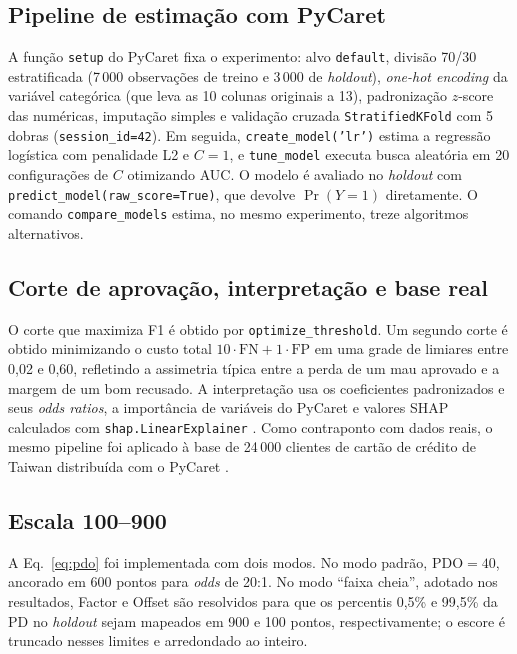 \documentclass[11pt,a4paper]{article}
\newcommand{\code}[1]{\texttt{#1}}
\begin{document}
\subsection{Pipeline de estimação com PyCaret}
\label{sec:pipeline}

A função \code{setup} do PyCaret fixa o experimento: alvo \code{default}, divisão 70/30 estratificada (7\,000 observações de treino e 3\,000 de \emph{holdout}), \emph{one-hot encoding} da variável categórica (que leva as 10 colunas originais a 13), padronização $z$-score das numéricas, imputação simples e validação cruzada \code{StratifiedKFold} com 5 dobras (\code{session\_id=42}). Em seguida, \code{create\_model('lr')} estima a regressão logística com penalidade L2 e $C=1$, e \code{tune\_model} executa busca aleatória em 20 configurações de $C$ otimizando AUC. O modelo é avaliado no \emph{holdout} com \code{predict\_model(raw\_score=True)}, que devolve $\Pr(Y=1)$ diretamente. O comando \code{compare\_models} estima, no mesmo experimento, treze algoritmos alternativos.

\subsection{Corte de aprovação, interpretação e base real}

O corte que maximiza F1 é obtido por \code{optimize\_threshold}. Um segundo corte é obtido minimizando o custo total $10\cdot\mathrm{FN}+1\cdot\mathrm{FP}$ em uma grade de limiares entre 0{,}02 e 0{,}60, refletindo a assimetria típica entre a perda de um mau aprovado e a margem de um bom recusado. A interpretação usa os coeficientes padronizados e seus \emph{odds ratios}, a importância de variáveis do PyCaret e valores SHAP calculados com \code{shap.LinearExplainer} \citep{lundberg2017,shapley1953}. Como contraponto com dados reais, o mesmo pipeline foi aplicado à base de 24\,000 clientes de cartão de crédito de Taiwan distribuída com o PyCaret \citep{yeh2009}.

\subsection{Escala 100--900}

A Eq.~\eqref{eq:pdo} foi implementada com dois modos. No modo padrão, PDO$=40$, ancorado em 600 pontos para \emph{odds} de 20:1. No modo ``faixa cheia'', adotado nos resultados, Factor e Offset são resolvidos para que os percentis 0{,}5\% e 99{,}5\% da PD no \emph{holdout} sejam mapeados em 900 e 100 pontos, respectivamente; o escore é truncado nesses limites e arredondado ao inteiro.
\end{document}
